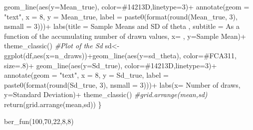 \documentclass[
]{article}
\newenvironment{Shaded}{\begin{snugshade}}{\end{snugshade}}
\newcommand{\AttributeTok}[1]{\textcolor[rgb]{0.77,0.63,0.00}{#1}}
\newcommand{\CommentTok}[1]{\textcolor[rgb]{0.56,0.35,0.01}{\textit{#1}}}
\newcommand{\DecValTok}[1]{\textcolor[rgb]{0.00,0.00,0.81}{#1}}
\newcommand{\FunctionTok}[1]{\textcolor[rgb]{0.00,0.00,0.00}{#1}}
\newcommand{\NormalTok}[1]{#1}
\newcommand{\OtherTok}[1]{\textcolor[rgb]{0.56,0.35,0.01}{#1}}
\newcommand{\SpecialCharTok}[1]{\textcolor[rgb]{0.00,0.00,0.00}{#1}}
\newcommand{\StringTok}[1]{\textcolor[rgb]{0.31,0.60,0.02}{#1}}
\begin{document}
\begin{Shaded}
\begin{Highlighting}[]
              \FunctionTok{geom\_line}\NormalTok{(}\FunctionTok{aes}\NormalTok{(}\AttributeTok{y=}\NormalTok{Mean\_true), }\AttributeTok{color=}\StringTok{\textquotesingle{}\#14213D\textquotesingle{}}\NormalTok{,}\AttributeTok{linetype=}\DecValTok{3}\NormalTok{)}\SpecialCharTok{+}
              \FunctionTok{annotate}\NormalTok{(}\AttributeTok{geom =} \StringTok{"text"}\NormalTok{, }\AttributeTok{x =} \DecValTok{8}\NormalTok{, }\AttributeTok{y =}\NormalTok{ Mean\_true, }
              \AttributeTok{label =} \FunctionTok{paste0}\NormalTok{(}\FunctionTok{format}\NormalTok{(}\FunctionTok{round}\NormalTok{(Mean\_true, }\DecValTok{3}\NormalTok{), }\AttributeTok{nsmall =} \DecValTok{3}\NormalTok{)))}\SpecialCharTok{+}
              \FunctionTok{labs}\NormalTok{(}\AttributeTok{title =} \StringTok{\textquotesingle{}Sample Means and SD of theta \textquotesingle{}}\NormalTok{,}
         \AttributeTok{subtitle =} \StringTok{\textquotesingle{}As a function of the accumulating number of drawn values\textquotesingle{}}\NormalTok{,}
                          \AttributeTok{x=} \StringTok{\textquotesingle{} \textquotesingle{}}\NormalTok{, }\AttributeTok{y=}\StringTok{\textquotesingle{}Sample Mean\textquotesingle{}}\NormalTok{)}\SpecialCharTok{+} \FunctionTok{theme\_classic}\NormalTok{()}
  \CommentTok{\#Plot of the Sd}
\NormalTok{  sd}\OtherTok{\textless{}{-}}\FunctionTok{ggplot}\NormalTok{(df,}\FunctionTok{aes}\NormalTok{(}\AttributeTok{x=}\NormalTok{n\_draws))}\SpecialCharTok{+}\FunctionTok{geom\_line}\NormalTok{(}\FunctionTok{aes}\NormalTok{(}\AttributeTok{y=}\NormalTok{sd\_theta),}
                                          \AttributeTok{color=}\StringTok{\textquotesingle{}\#FCA311\textquotesingle{}}\NormalTok{, }\AttributeTok{size=}\NormalTok{.}\DecValTok{8}\NormalTok{)}\SpecialCharTok{+}
              \FunctionTok{geom\_line}\NormalTok{(}\FunctionTok{aes}\NormalTok{(}\AttributeTok{y=}\NormalTok{Sd\_true), }\AttributeTok{color=}\StringTok{\textquotesingle{}\#14213D\textquotesingle{}}\NormalTok{,}\AttributeTok{linetype=}\DecValTok{3}\NormalTok{)}\SpecialCharTok{+}
              \FunctionTok{annotate}\NormalTok{(}\AttributeTok{geom =} \StringTok{"text"}\NormalTok{, }\AttributeTok{x =} \DecValTok{8}\NormalTok{, }\AttributeTok{y =}\NormalTok{ Sd\_true,}
              \AttributeTok{label =} \FunctionTok{paste0}\NormalTok{(}\FunctionTok{format}\NormalTok{(}\FunctionTok{round}\NormalTok{(Sd\_true, }\DecValTok{3}\NormalTok{), }\AttributeTok{nsmall =} \DecValTok{3}\NormalTok{)))}\SpecialCharTok{+}
              \FunctionTok{labs}\NormalTok{(}\AttributeTok{x=} \StringTok{\textquotesingle{}Number of draws\textquotesingle{}}\NormalTok{, }\AttributeTok{y=}\StringTok{\textquotesingle{}Standard Deviation\textquotesingle{}}\NormalTok{)}\SpecialCharTok{+}
              \FunctionTok{theme\_classic}\NormalTok{()}
  \CommentTok{\#grid.arrange(mean,sd)}
  \FunctionTok{return}\NormalTok{(}\FunctionTok{grid.arrange}\NormalTok{(mean,sd))}
\NormalTok{\}}


\FunctionTok{ber\_fun}\NormalTok{(}\DecValTok{100}\NormalTok{,}\DecValTok{70}\NormalTok{,}\DecValTok{22}\NormalTok{,}\DecValTok{8}\NormalTok{,}\DecValTok{8}\NormalTok{)}
\end{Highlighting}
\end{Shaded}
\end{document}

